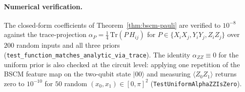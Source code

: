 \documentclass[pdflatex,sn-mathphys]{sn-jnl}
\theoremstyle{plain}
\theoremstyle{remark}
\theoremstyle{definition}
\begin{document}
\paragraph{Numerical verification.}
The closed-form coefficients of Theorem~\ref{thm:bscm-pauli} are verified to $10^{-8}$ against the trace-projection $\alpha_P = \tfrac{1}{4}\,\mathrm{Tr}(P\,H_{ij})$ for $P\in\{X_iX_j, Y_iY_j, Z_iZ_j\}$ over $200$ random inputs and all three priors (\texttt{test\_function\_matches\_analytic\_via\_trace}). The identity $\alpha_{ZZ}\equiv 0$ for the uniform prior is also checked at the circuit level: applying one repetition of the BSCM feature map on the two-qubit state $|00\rangle$ and measuring $\langle Z_0 Z_1\rangle$ returns zero to $10^{-10}$ for $50$ random $(x_0, x_1)\in[0,\pi]^2$ (\texttt{TestUniformAlphaZZIsZero}).


\end{document}
